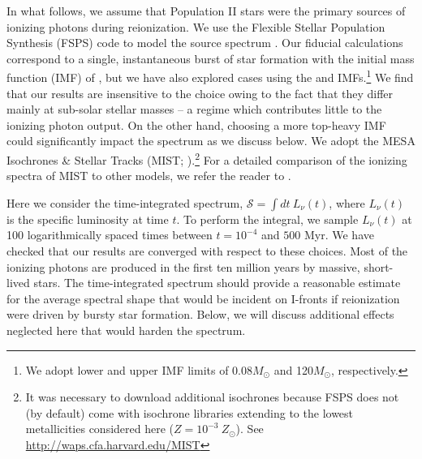 \documentclass[twocolumn]{aastex62}
\begin{document}
In what follows, we assume that Population II stars were the primary sources of ionizing photons during reionization.  We use the Flexible Stellar Population Synthesis (FSPS) code to model the source spectrum \citep{2009ApJ...699..486C, 2010ApJ...712..833C}.  Our fiducial calculations correspond to a single, instantaneous burst of star formation with the initial mass function (IMF) of \citet{2003ApJ...586L.133C}, but we have also explored cases using the \citet{1955ApJ...121..161S} and \citet{2001MNRAS.322..231K} IMFs.\footnote{We adopt lower and upper IMF limits of 0.08$M_{\odot}$ and 120$M_{\odot}$, respectively.}  We find that our results are insensitive to the choice owing to the fact that they differ mainly at sub-solar stellar masses -- a regime which contributes little to the ionizing photon output.  On the other hand, choosing a more top-heavy IMF could significantly impact the spectrum as we discuss below.  We adopt the MESA Isochrones \& Stellar Tracks (MIST; \citealt{2016ApJS..222....8D,2016ApJ...823..102C,2011ApJS..192....3P,2013ApJS..208....4P, 2015ApJS..220...15P}).\footnote{It was necessary to download additional isochrones because FSPS does not (by default) come with isochrone libraries extending to the lowest metallicities considered here ($Z=10^{-3}~Z_{\odot}$). See \url{http://waps.cfa.harvard.edu/MIST}  }  For a detailed comparison of the ionizing spectra of MIST to other models, we refer the reader to \citet{2017ApJ...838..159C}.    

Here we consider the time-integrated spectrum, $\mathcal{S} = \int dt~L_{\nu}(t)$, where $L_{\nu}(t)$ is the specific luminosity at time $t$.  To perform the integral, we sample $L_{\nu}(t)$ at 100 logarithmically spaced times between $t=10^{-4}$ and $500$ Myr.  We have checked that our results are converged with respect to these choices.   Most of the ionizing photons are produced in the first ten million years by massive, short-lived stars.   The time-integrated spectrum should provide a reasonable estimate for the average spectral shape that would be incident on I-fronts if reionization were driven by bursty star formation.  Below, we will discuss additional effects neglected here that would harden the spectrum.    
\end{document}

